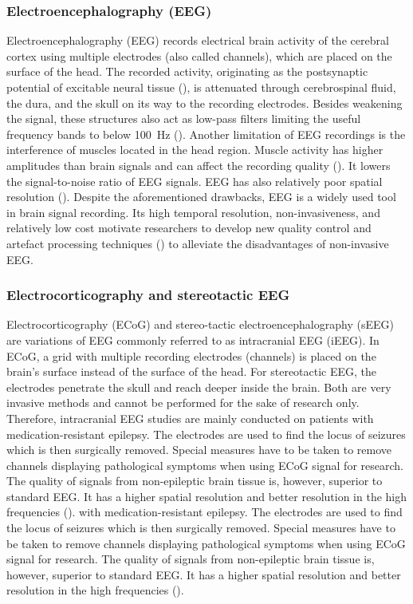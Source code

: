 \subsubsection{Electroencephalography (EEG)}
Electroencephalography (EEG) records electrical brain activity of the cerebral cortex using multiple electrodes (also called channels), which are placed on the surface of the head. The recorded activity, originating as the postsynaptic potential of excitable neural tissue (\cite{buzsaki-origin-2012}), is attenuated through cerebrospinal fluid, the dura, and the skull on its way to the recording electrodes. Besides weakening the signal, these structures also act as low-pass filters limiting the useful frequency bands to below 100~Hz (\cite{tam-human-2019}). Another limitation of EEG recordings is the interference of muscles located in the head region. Muscle activity has higher amplitudes than brain signals and can affect the recording quality (\cite{scholg-presence-2002}). It lowers the signal-to-noise ratio of EEG signals. EEG has also relatively poor spatial resolution (\cite{buzsaki-origin-2012}). Despite the aforementioned drawbacks, EEG is a widely used tool in brain signal recording. Its high temporal resolution, non-invasiveness, and relatively low cost motivate researchers to develop new quality control and artefact processing techniques (\cite{lotte2018review}) to alleviate the disadvantages of non-invasive EEG. 

\subsubsection{Electrocorticography and stereotactic EEG}
Electrocorticography (ECoG) and stereo-tactic electroencephalography (sEEG) are variations of EEG commonly referred to as intracranial EEG (iEEG).
In ECoG, a grid with multiple recording electrodes (channels) is placed on the brain's surface instead of the surface of the head.
For stereotactic EEG, the electrodes penetrate the skull and reach deeper inside the brain. Both are very invasive methods and cannot be performed for the sake of research only.
Therefore, intracranial EEG studies are mainly conducted on patients with medication-resistant epilepsy.
The electrodes are used to find the locus of seizures which is then surgically removed. Special measures have to be taken to remove channels displaying pathological symptoms when using ECoG signal for research.
The quality of signals from non-epileptic brain tissue is, however, superior to standard EEG. It has a higher spatial resolution and better resolution in the high frequencies (\cite{volkova-review}).
with medication-resistant epilepsy.
The electrodes are used to find the locus of seizures which is then surgically removed. Special measures have to be taken to remove channels displaying pathological symptoms when using ECoG signal for research.
The quality of signals from non-epileptic brain tissue is, however, superior to standard EEG. It has a higher spatial resolution and better resolution in the high frequencies (\cite{volkova-review}).

